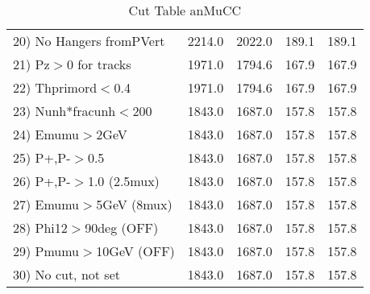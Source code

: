 \begin{table}[h!]
\begin{tabular}{||l||r|r|r|r||}
 20) No Hangers fromPVert &      2214.0 &      2022.0 &       189.1 &       189.1 \\
 21) Pz$>$0 for tracks    &      1971.0 &      1794.6 &       167.9 &       167.9 \\
 22) Thprimord$<$0.4      &      1971.0 &      1794.6 &       167.9 &       167.9 \\
 23) Nunh*fracunh$<$200   &      1843.0 &      1687.0 &       157.8 &       157.8 \\
 24) Emumu$>$2GeV         &      1843.0 &      1687.0 &       157.8 &       157.8 \\
 25) P+,P-$>$0.5          &      1843.0 &      1687.0 &       157.8 &       157.8 \\
 26) P+,P-$>$1.0 (2.5mux) &      1843.0 &      1687.0 &       157.8 &       157.8 \\
 27) Emumu$>$5GeV  (8mux) &      1843.0 &      1687.0 &       157.8 &       157.8 \\
 28) Phi12$>$90deg  (OFF) &      1843.0 &      1687.0 &       157.8 &       157.8 \\
 29) Pmumu$>$10GeV  (OFF) &      1843.0 &      1687.0 &       157.8 &       157.8 \\
 30) No cut, not set      &      1843.0 &      1687.0 &       157.8 &       157.8 \\
 \hline
 \hline
 \end{tabular}
 \caption{Cut Table  anMuCC }
 \label{tab-cut_anmcc}
 \end{table}
